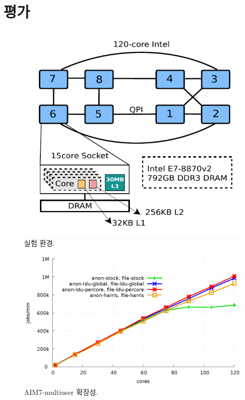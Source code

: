 \newpage

\section{평가}
\label{sec:evaluation}
\begin{figure}[h!]
  \begin{center}
    \includegraphics[scale=1.2]{fig/xeon}
  \end{center}
  \caption{실험 환경.}
  \label{fig:xeon}
\end{figure}


\begin{figure}[tb]
  \begin{center}
    \includegraphics[scale=0.8]{graph/aim7.eps}
  \end{center}
  \caption{AIM7-multiuser 확장성.}
  \label{fig:aim7}
\end{figure}


